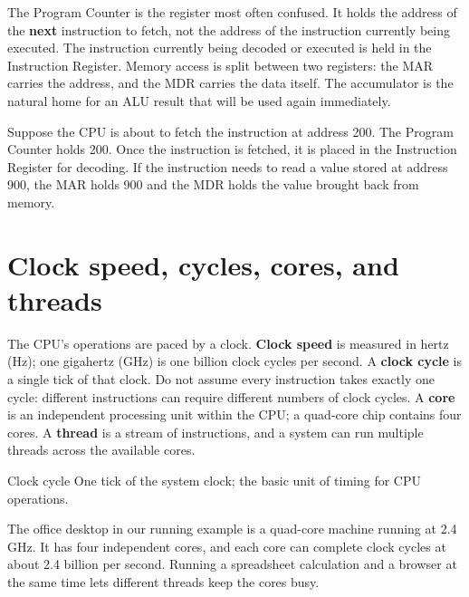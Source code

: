 The Program Counter is the register most often confused. It holds the
address of the \textbf{next} instruction to fetch, not the address of the
instruction currently being executed. The instruction currently being
decoded or executed is held in the Instruction Register. Memory access is
split between two registers: the MAR carries the address, and the MDR carries
the data itself. The accumulator is the natural home for an ALU result that
will be used again immediately.

\begin{example}
Suppose the CPU is about to fetch the instruction at address 200. The
Program Counter holds 200. Once the instruction is fetched, it is placed in
the Instruction Register for decoding. If the instruction needs to read a
value stored at address 900, the MAR holds 900 and the MDR holds the value
brought back from memory.
\end{example}

\section{Clock speed, cycles, cores, and threads}
The CPU's operations are paced by a clock. \textbf{Clock speed} is measured
in hertz (Hz); one gigahertz (GHz) is one billion clock cycles per second. A
\textbf{clock cycle} is a single tick of that clock. Do not assume every
instruction takes exactly one cycle: different instructions can require
different numbers of clock cycles. A \textbf{core} is an independent
processing unit within the CPU; a quad-core chip contains four cores. A
\textbf{thread} is a stream of instructions, and a system can run multiple
threads across the available cores.

\begin{definitionbox}{Clock cycle}
One tick of the system clock; the basic unit of timing for CPU operations.
\end{definitionbox}

\begin{example}
The office desktop in our running example is a quad-core machine running at
2.4 GHz. It has four independent cores, and each core can complete clock
cycles at about 2.4 billion per second. Running a spreadsheet calculation and
a browser at the same time lets different threads keep the cores busy.
\end{example}

